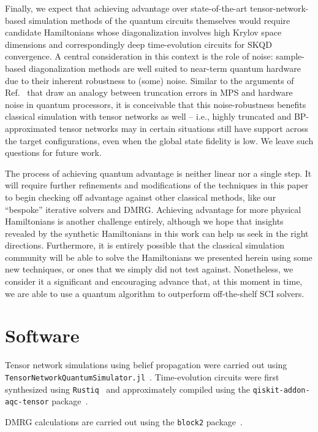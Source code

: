 \documentclass[
  reprint,            %
  amsmath,amssymb,
  aps,
  superscriptaddress, %
  longbibliography
]{revtex4-2}
\theoremstyle{definition}
\begin{document}
Finally, we expect that achieving advantage over state-of-the-art tensor-network-based simulation methods of the quantum circuits themselves would require candidate Hamiltonians whose diagonalization involves high Krylov space dimensions and correspondingly deep time-evolution circuits for SKQD convergence.
A central consideration in this context is the role of noise: sample-based diagonalization methods are well suited to near-term quantum hardware due to their inherent robustness to (some) noise.
Similar to the arguments of Ref.~\cite{Zhou_WhatLimits_2020} that draw an analogy between truncation errors in MPS and hardware noise in quantum processors, it is conceivable that this noise-robustness benefits classical simulation with tensor networks as well --  i.e., highly truncated and BP-approximated tensor networks may in certain situations still have support across the target configurations, even when the global state fidelity is low. We leave such questions for future work.

The process of achieving quantum advantage is neither linear nor a single step.
It will require further refinements and modifications of the techniques in this paper to begin checking off advantage against other classical methods, like our ``bespoke'' iterative solvers and DMRG. 
Achieving advantage for more physical Hamiltonians is another challenge entirely, although we hope that insights revealed by the synthetic Hamiltonians in this work can help us seek in the right directions.
Furthermore, it is entirely possible that the classical simulation community will be able to solve the Hamiltonians we presented herein using some new techniques, or ones that we simply did not test against.
Nonetheless, we consider it a significant and encouraging advance that, at this moment in time, we are able to use a quantum algorithm to outperform off-the-shelf SCI solvers.

\section*{Software}
Tensor network simulations using belief propagation were carried out using \texttt{TensorNetworkQuantumSimulator.jl}~\cite{TindallRudolph_TNQS}. Time-evolution circuits were first synthesized using \texttt{Rustiq}~\cite{martiel2025rustiq} and approximately compiled using the \texttt{qiskit-addon-aqc-tensor} package~\cite{qiskit-addon-aqc-tensor}.

DMRG calculations are carried out using the \texttt{block2} package~\cite{block2}.
\end{document}
